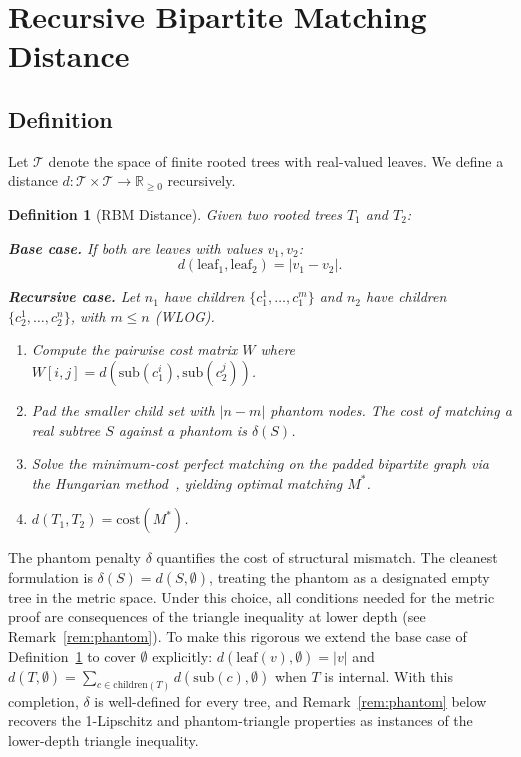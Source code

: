 \documentclass[11pt]{article}
\newtheorem{definition}[theorem]{Definition}
\newcommand{\sub}{\mathrm{sub}}
\newcommand{\cost}{\mathrm{cost}}
\newcommand{\R}{\mathbb{R}}
\newcommand{\calT}{\mathcal{T}}
\begin{document}
\section{Recursive Bipartite Matching Distance}
\label{sec:rbm}

\subsection{Definition}

Let $\calT$ denote the space of finite rooted trees with real-valued
leaves. We define a distance $d : \calT \times \calT \to \R_{\ge 0}$
recursively.

\begin{definition}[RBM Distance]
\label{def:rbm}
Given two rooted trees $T_1$ and $T_2$:

\textbf{Base case.} If both are leaves with values $v_1, v_2$:
\[
  d(\mathrm{leaf}_1, \mathrm{leaf}_2) = |v_1 - v_2|.
\]

\textbf{Recursive case.} Let $n_1$ have children $\{c_1^1, \ldots,
c_1^m\}$ and $n_2$ have children $\{c_2^1, \ldots, c_2^n\}$, with $m
\le n$ (WLOG).
\begin{enumerate}[nosep]
  \item Compute the pairwise cost matrix $W$ where $W[i,j] =
    d(\sub(c_1^i), \sub(c_2^j))$.
  \item Pad the smaller child set with $|n - m|$ \emph{phantom nodes}.
    The cost of matching a real subtree $S$ against a phantom is
    $\delta(S)$.
  \item Solve the minimum-cost perfect matching on the padded bipartite
    graph via the Hungarian method~\citep{kuhn1955hungarian}, yielding
    optimal matching $M^*$.
  \item $d(T_1, T_2) = \cost(M^*)$.
\end{enumerate}
\end{definition}

The phantom penalty $\delta$ quantifies the cost of structural
mismatch. The cleanest formulation is $\delta(S) = d(S, \emptyset)$,
treating the phantom as a designated empty tree in the metric space.
Under this choice, all conditions needed for the metric proof are
consequences of the triangle inequality at lower depth (see
Remark~\ref{rem:phantom}). To make this rigorous we extend the base
case of Definition~\ref{def:rbm} to cover $\emptyset$ explicitly:
$d(\mathrm{leaf}(v), \emptyset) = |v|$ and $d(T, \emptyset) =
\sum_{c \in \mathrm{children}(T)} d(\sub(c), \emptyset)$ when $T$ is
internal. With this completion, $\delta$ is well-defined for every
tree, and Remark~\ref{rem:phantom} below recovers the 1-Lipschitz and
phantom-triangle properties as instances of the lower-depth triangle
inequality.
\end{document}

